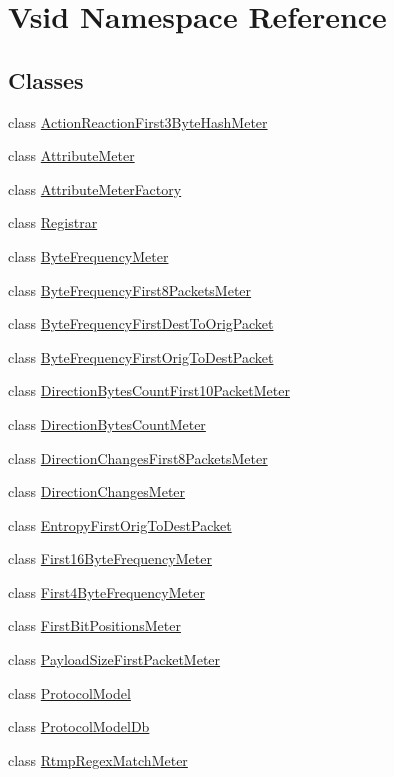 \hypertarget{namespace_vsid}{\section{Vsid Namespace Reference}
\label{namespace_vsid}
}
\subsection*{Classes}
\begin{DoxyCompactItemize}
\item 
class \hyperlink{class_vsid_1_1_action_reaction_first3_byte_hash_meter}{Action\-Reaction\-First3\-Byte\-Hash\-Meter}
\item 
class \hyperlink{class_vsid_1_1_attribute_meter}{Attribute\-Meter}
\item 
class \hyperlink{class_vsid_1_1_attribute_meter_factory}{Attribute\-Meter\-Factory}
\item 
class \hyperlink{class_vsid_1_1_registrar}{Registrar}
\item 
class \hyperlink{class_vsid_1_1_byte_frequency_meter}{Byte\-Frequency\-Meter}
\item 
class \hyperlink{class_vsid_1_1_byte_frequency_first8_packets_meter}{Byte\-Frequency\-First8\-Packets\-Meter}
\item 
class \hyperlink{class_vsid_1_1_byte_frequency_first_dest_to_orig_packet}{Byte\-Frequency\-First\-Dest\-To\-Orig\-Packet}
\item 
class \hyperlink{class_vsid_1_1_byte_frequency_first_orig_to_dest_packet}{Byte\-Frequency\-First\-Orig\-To\-Dest\-Packet}
\item 
class \hyperlink{class_vsid_1_1_direction_bytes_count_first10_packet_meter}{Direction\-Bytes\-Count\-First10\-Packet\-Meter}
\item 
class \hyperlink{class_vsid_1_1_direction_bytes_count_meter}{Direction\-Bytes\-Count\-Meter}
\item 
class \hyperlink{class_vsid_1_1_direction_changes_first8_packets_meter}{Direction\-Changes\-First8\-Packets\-Meter}
\item 
class \hyperlink{class_vsid_1_1_direction_changes_meter}{Direction\-Changes\-Meter}
\item 
class \hyperlink{class_vsid_1_1_entropy_first_orig_to_dest_packet}{Entropy\-First\-Orig\-To\-Dest\-Packet}
\item 
class \hyperlink{class_vsid_1_1_first16_byte_frequency_meter}{First16\-Byte\-Frequency\-Meter}
\item 
class \hyperlink{class_vsid_1_1_first4_byte_frequency_meter}{First4\-Byte\-Frequency\-Meter}
\item 
class \hyperlink{class_vsid_1_1_first_bit_positions_meter}{First\-Bit\-Positions\-Meter}
\item 
class \hyperlink{class_vsid_1_1_payload_size_first_packet_meter}{Payload\-Size\-First\-Packet\-Meter}
\item 
class \hyperlink{class_vsid_1_1_protocol_model}{Protocol\-Model}
\item 
class \hyperlink{class_vsid_1_1_protocol_model_db}{Protocol\-Model\-Db}
\item 
class \hyperlink{class_vsid_1_1_rtmp_regex_match_meter}{Rtmp\-Regex\-Match\-Meter}
\end{DoxyCompactItemize}
